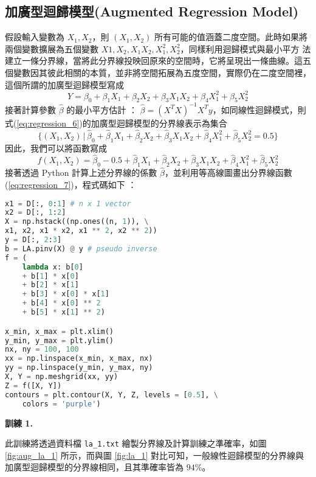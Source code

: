 \subsection{加廣型迴歸模型(Augmented Regression Model)}
假設輸入變數為 $X_1, X_2$，則 $(X_1, X_2)$ 所有可能的值涵蓋二度空間。此時如果將
兩個變數擴展為五個變數 $X1, X_2, X_1X_2, X_1^2, X_2^2$，同樣利用迴歸模式與最小平方
法建立一條分界線，當將此分界線投映回原來的空間時，它將呈現出一條曲線。這五個變數因其彼此相關的本質，並非將空間拓展為五度空間，實際仍在二度空間裡，這個所謂的加廣型迴歸模型寫成
\begin{equation}\label{eq:regression_6}
Y = \beta_0 + \beta_1X_{1} + \beta_2X_{2} + \beta_3 X_{1}X_{2} + \beta_4 X_{1}^2 + \beta_5 X_{2}^2
\end{equation}
接著計算參數 $\hat{\beta}$ 的最小平方估計 ： $\hat{\beta} = (X^T X)^{-1} X^T y$，如同線性迴歸模式，則式(\ref{eq:regression_6})的加廣型迴歸模型的分界線表示為集合
\[\big\{(X_1, X_2)\,|\,\hat{\beta}_0 + \hat{\beta}_1X_1 + \hat{\beta}_2X_2 + \hat{\beta}_3X_1X_2 + \hat{\beta}_4X_1^2 + \hat{\beta}_5X_2^2 = 0.5\big\}\]
因此，我們可以將函數寫成
\begin{equation}\label{eq:regression_7}
f(X_1, X_2) = \hat{\beta}_0 - 0.5 + \hat{\beta}_1X_1 + \hat{\beta}_2X_2 + \hat{\beta}_3X_1X_2 + \hat{\beta}_4X_1^2 + \hat{\beta}_5X_2^2
\end{equation}
接著透過 Python 計算上述分界線的係數 $\hat{\beta}$，並利用等高線圖畫出分界線函數(\ref{eq:regression_7})，程式碼如下 ：
\bigskip
\begin{lstlisting}[language = Python]
x1 = D[:, 0:1] # n x 1 vector
x2 = D[:, 1:2]
X = np.hstack((np.ones((n, 1)), \
x1, x2, x1 * x2, x1 ** 2, x2 ** 2))
y = D[:, 2:3]
b = LA.pinv(X) @ y # pseudo inverse
f = (
    lambda x: b[0]
    + b[1] * x[0]
    + b[2] * x[1]
    + b[3] * x[0] * x[1]
    + b[4] * x[0] ** 2
    + b[5] * x[1] ** 2)

x_min, x_max = plt.xlim()
y_min, y_max = plt.ylim()
nx, ny = 100, 100
xx = np.linspace(x_min, x_max, nx)
yy = np.linspace(y_min, y_max, ny)
X, Y = np.meshgrid(xx, yy)
Z = f([X, Y])
contours = plt.contour(X, Y, Z, levels = [0.5], \
	colors = 'purple')
\end{lstlisting}

\textbf{\large 訓練 1.} 

此訓練將透過資料檔 \verb|la_1.txt| 繪製分界線及計算訓練之準確率，如圖 \ref{fig:aug_la_1} 所示，而與圖 \ref{fig:la_1} 對比可知，一般線性迴歸模型的分界線與加廣型迴歸模型的分界線相同，且其準確率皆為 $94\%$。

